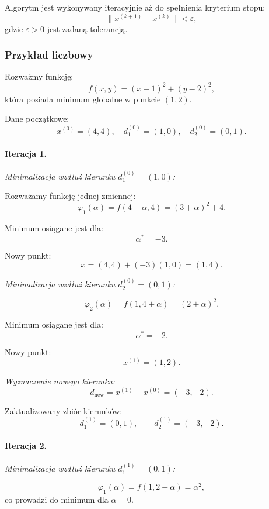 \documentclass[10pt,a4paper]{article}
\begin{document}
Algorytm jest wykonywany iteracyjnie aż do spełnienia kryterium stopu:
\[
\|x^{(k+1)} - x^{(k)}\| < \varepsilon,
\]
gdzie $\varepsilon > 0$ jest zadaną tolerancją.



\subsubsection{Przykład liczbowy}

Rozważmy funkcję:
\[
f(x,y) = (x-1)^2 + (y-2)^2,
\]
która posiada minimum globalne w punkcie $(1,2)$.

Dane początkowe:
\[
x^{(0)} = (4,4),
\quad
d_1^{(0)} = (1,0),
\quad
d_2^{(0)} = (0,1).
\]



\paragraph{Iteracja 1.}

\emph{Minimalizacja wzdłuż kierunku $d_1^{(0)}=(1,0)$:}

Rozważamy funkcję jednej zmiennej:
\[
\varphi_1(\alpha) = f(4+\alpha, 4)
= (3+\alpha)^2 + 4.
\]

Minimum osiągane jest dla:
\[
\alpha^* = -3.
\]

Nowy punkt:
\[
x = (4,4) + (-3)(1,0) = (1,4).
\]



\emph{Minimalizacja wzdłuż kierunku $d_2^{(0)}=(0,1)$:}

\[
\varphi_2(\alpha) = f(1,4+\alpha)
= (2+\alpha)^2.
\]

Minimum osiągane jest dla:
\[
\alpha^* = -2.
\]

Nowy punkt:
\[
x^{(1)} = (1,2).
\]



\emph{Wyznaczenie nowego kierunku:}
\[
d_{\text{new}} = x^{(1)} - x^{(0)} = (-3,-2).
\]

Zaktualizowany zbiór kierunków:
\[
d_1^{(1)} = (0,1), \qquad d_2^{(1)} = (-3,-2).
\]



\paragraph{Iteracja 2.}

\emph{Minimalizacja wzdłuż kierunku $d_1^{(1)}=(0,1)$:}

\[
\varphi_1(\alpha) = f(1,2+\alpha) = \alpha^2,
\]
co prowadzi do minimum dla $\alpha = 0$.
\end{document}
